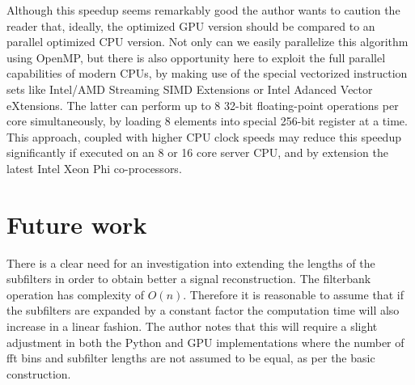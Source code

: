 \documentclass[a4paper,10pt]{article}
\begin{document}
Although this speedup seems remarkably good the author wants to caution the reader that, ideally, the optimized GPU version should be compared to an parallel optimized CPU
version. Not only can we easily parallelize this algorithm using OpenMP, but there is also opportunity here to exploit the full parallel capabilities of modern CPUs,
by making use of the special vectorized instruction sets like Intel/AMD Streaming SIMD Extensions or Intel Adanced Vector eXtensions. The latter can perform up to 8 32-bit 
floating-point operations per core simultaneously, by loading 8 elements into special 256-bit register at a time. This approach, coupled with higher CPU clock speeds may reduce this speedup 
significantly if executed on an 8 or 16 core server CPU, and by extension the latest Intel Xeon Phi co-processors.

\section{Future work}
There is a clear need for an investigation into extending the lengths of the subfilters in order to obtain better a signal reconstruction. The filterbank operation has complexity 
of $O(n)$. Therefore it is reasonable to assume that if the subfilters are expanded by a constant factor the computation time will also increase in a linear fashion. The author 
notes that this will require a slight adjustment in both the Python and GPU implementations where the number of \gls{fft} bins and subfilter lengths are not assumed to be equal, 
as per the basic construction.
\pagebreak
{}

\end{document}
